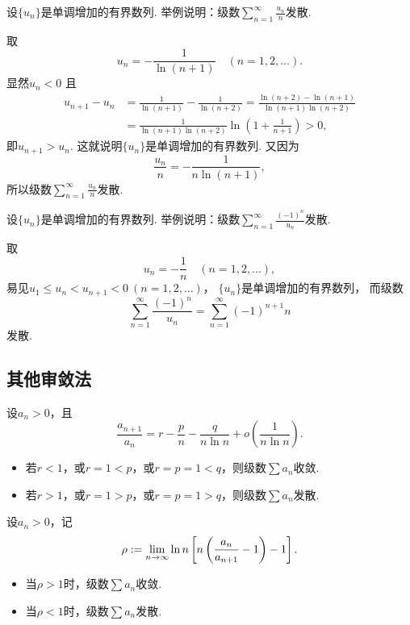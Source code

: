 \begin{example}
设\(\{u_n\}\)是单调增加的有界数列.
举例说明：级数\(\sum_{n=1}^\infty \frac{u_n}{n}\)发散.
\begin{solution}
取\[
	u_n = -\frac1{\ln(n+1)}
	\quad(n=1,2,\dotsc).
\]
显然\(u_n<0\)
且\begin{align*}
	u_{n+1} - u_n
	&= \frac1{\ln(n+1)} - \frac1{\ln(n+2)}
	= \frac{\ln(n+2)-\ln(n+1)}{\ln(n+1) \ln(n+2)} \\
	&= \frac1{\ln(n+1) \ln(n+2)} \ln\left(1+\frac1{n+1}\right)
	> 0,
\end{align*}
即\(u_{n+1} > u_n\).
这就说明\(\{u_n\}\)是单调增加的有界数列.
又因为\[
	\frac{u_n}{n}
	= -\frac1{n \ln(n+1)},
\]
所以级数\(\sum_{n=1}^\infty \frac{u_n}{n}\)发散.
\end{solution}
\end{example}

\begin{example}
设\(\{u_n\}\)是单调增加的有界数列.
举例说明：级数\(\sum_{n=1}^\infty \frac{(-1)^n}{u_n}\)发散.
\begin{solution}
取\[
	u_n = -\frac1n
	\quad(n=1,2,\dotsc),
\]
易见\(u_1 \leq u_n < u_{n+1} < 0\ (n=1,2,\dotsc)\)，
\(\{u_n\}\)是单调增加的有界数列，
而级数\[
	\sum_{n=1}^\infty \frac{(-1)^n}{u_n}
	= \sum_{n=1}^\infty (-1)^{n+1} n
\]发散.
\end{solution}
\end{example}

\subsection{其他审敛法}
\begin{theorem}
设\(a_n>0\)，且\[
	\frac{a_{n+1}}{a_n}
	= r - \frac{p}{n} - \frac{q}{n \ln n} + o\left(\frac1{n \ln n}\right).
\]
\begin{itemize}
	\item 若\(r<1\)，或\(r=1<p\)，或\(r=p=1<q\)，则级数\(\sum a_n\)收敛.
	\item 若\(r>1\)，或\(r=1>p\)，或\(r=p=1>q\)，则级数\(\sum a_n\)发散.
\end{itemize}
\end{theorem}

\begin{corollary}[贝特朗审敛法]
设\(a_n>0\)，记\[
	\rho
	:=
	\lim_{n\to\infty} \ln n \left[
		n \left( \frac{a_n}{a_{n+1}} - 1 \right) - 1
	\right].
\]
\begin{itemize}
	\item 当\(\rho>1\)时，级数\(\sum a_n\)收敛.
	\item 当\(\rho<1\)时，级数\(\sum a_n\)发散.
\end{itemize}
\end{corollary}

